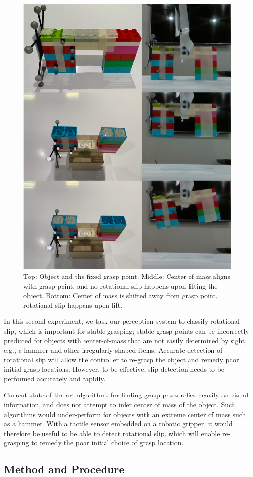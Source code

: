 \documentclass[fyp]{socreport}
\begin{document}
\begin{figure}
  \centering
  \includegraphics[width=0.55\columnwidth]{images/robotsetup/slip_graf.png}
  \caption{Top: Object and the fixed grasp point. Middle: Center of mass aligns
    with grasp point, and no rotational slip happens upon lifting the object.
    Bottom: Center of mass is shifted away from grasp point, rotational slip
    happens upon lift.\label{img:slips}}
\end{figure}

In this second experiment, we task our perception system to classify rotational
slip, which is important for stable grasping; stable grasp points can be
incorrectly predicted for objects with center-of-mass that are not easily
determined by sight, e.g., a hammer and other irregularly-shaped items. Accurate
detection of rotational slip will allow the controller to re-grasp the object
and remedy poor initial grasp locations. However, to be effective, slip
detection needs to be performed accurately and rapidly.

Current state-of-the-art algorithms for finding grasp poses relies heavily on
visual information, and does not attempt to infer center of mass of the object.
Such algorithms would under-perform for objects with an extreme center of mass
such as a hammer. With a tactile sensor embedded on a robotic gripper, it would
therefore be useful to be able to detect rotational slip, which will enable
re-grasping to remedy the poor initial choice of grasp location.

\subsection{Method and Procedure}
\end{document}

